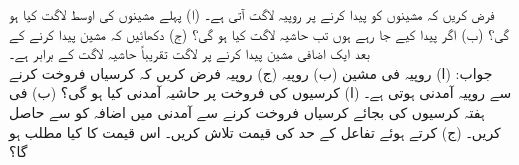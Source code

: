  \quad
فرض کریں کہ  مشینوں کو پیدا کرنے پر   روپیہ لاگت آتی ہے۔ (ا) پہلے  مشینوں کی اوسط لاگت کیا ہو گی؟ (ب) اگر   پیدا کیے جا رہے ہوں تب حاشیہ لاگت کیا ہو گی؟ (ج)  دکھائیں کہ  مشین پیدا کرنے کے بعد ایک اضافی مشین پیدا کرنے پر لاگت تقریباً حاشیہ لاگت کے برابر ہے۔\\
جواب:\quad
(ا)  روپیہ فی مشین (ب)  روپیہ  (ج)   روپیہ
\quad
فرض کریں کہ  کرسیاں فروخت کرنے سے  روپیہ آمدنی ہوتی ہے۔ (ا)  کرسیوں کی فروخت پر حاشیہ آمدنی کیا ہو گی؟ (ب) فی ہفتہ  کرسیوں  کی بجائے  کرسیاں فروخت کرنے سے آمدنی میں اضافہ کو  سے حاصل کریں۔ (ج)  کرتے ہوئے تفاعل  کے حد کی قیمت تلاش کریں۔ اس قیمت کا کیا مطلب ہو گا؟


